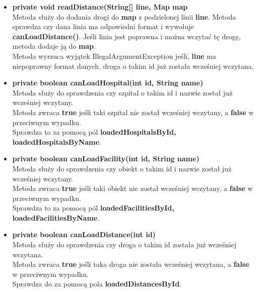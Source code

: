 \documentclass[]{article}
\begin{document}
\begin{itemize}
                        \item \textbf{private void readDistance(String[] line, Map map}\\
                            Metoda służy do dodania drogi do \textbf{map} z podzielonej linii \textbf{line}.
                            Metoda sprawdza czy dana linia ma odpowiedni format i wywołuje \textbf{canLoadDistance()}.
                            Jeśli linia jest poprawna i można wczytać tę drogę, metoda dodaje ją do \textbf{map}.\\
                            Metoda wyrzuca wyjątek IllegalArgumentException jeśli,
                                \textbf{line} ma niepoprawny format danych,
                                droga o takim id już została wcześniej wczytana.
                                
                        \item \textbf{private boolean canLoadHospital(int id, String name)}\\
                            Metoda służy do sprawdzenia czy szpital o takim id i nazwie został już wcześniej wczytany.\\
                            Metoda zwraca \textbf{true} jeśli taki szpital nie został wcześniej wczytany,
                            a \textbf{false} w przeciwnym wypadku.\\
                            Sprawdza to za pomocą pól \textbf{loadedHospitalsById, loadedHospitalsByName}.
                            
                        \item \textbf{private boolean canLoadFacility(int id, String name)}\\
                            Metoda służy do sprawdzenia czy obiekt o takim id i nazwie został już wcześniej wczytany.\\
                            Metoda zwraca \textbf{true} jeśli taki obiekt nie został wcześniej wczytany,
                            a \textbf{false} w przeciwnym wypadku.\\
                            Sprawdza to za pomocą pól \textbf{loadedFacilitiesById, loadedFacilitiesByName}.
                            
                        \item \textbf{private boolean canLoadDistance(int id)}\\
                            Metoda służy do sprawdzenia czy droga o takim id została już wcześniej wczytana.\\
                            Metoda zwraca \textbf{true} jeśli taka droga nie została wcześniej wczytana,
                            a \textbf{false} w przeciwnym wypadku.\\
                            Sprawdza do za pomocą pola \textbf{loadedDistancesById}.
                    \end{itemize}
                    
\end{document}
